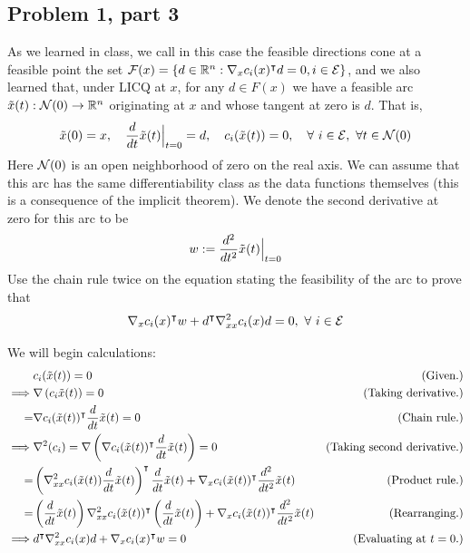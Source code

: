 \newpage
\subsection{Problem 1, part 3}
As we learned in class, we call in this case the feasible directions cone at a feasible point the set $\mathcal{F}(x) = \{ d \in \mathbb{R}^n : \nabla_x c_i(x)^{\intercal} d = 0, i \in \mathcal{E}\}$, and we also learned that, under LICQ at $x$, for any $d \in F(x)$ we have a feasible arc $\Tilde{x}(t): \mathcal{N}(0) \rightarrow \mathbb{R}^n$ originating at $x$ and whose tangent at zero is $d$. That is, 
\[\Tilde{x}(0) = x, \quad \frac{d}{dt}\Tilde{x}(t) \Big|_{t = 0} = d, \quad c_i(\Tilde{x}(t)) = 0,  \quad \forall \ i \in \mathcal{E}, \ \forall t \in \mathcal{N}(0)\]
Here $\mathcal{N}(0)$ is an open neighborhood of zero on the real axis. We can assume that this arc has the same differentiability class as the data functions themselves (this is a consequence of the implicit theorem). We denote the second derivative at zero for this arc to be 
\[w := \frac{d^2}{dt^2}\Tilde{x}(t)\Big|_{t = 0}\]
Use the chain rule twice on the equation stating the feasibility of the arc to prove that
\[\nabla_x c_i(x)^{\intercal} w + d^{\intercal} \nabla_{xx}^2c_i(x) d = 0, \ \forall \ i \in \mathcal{E}\]
\partbreak
\begin{solution}
    
    We will begin calculations:
    \tightalignbreak
    \begin{align*}
        &c_i(\Tilde{x}(t)) = 0 &\text{(Given.)}\\
        \implies &\nabla\left( c_i\Tilde{x}(t)\right) = 0 &\text{(Taking derivative.)}\\
        =& \nabla c_i(\Tilde{x}(t))^{\intercal} \frac{d}{dt}\Tilde{x}(t) = 0 &\text{(Chain rule.)}\\
        \implies & \nabla^2(c_i) = \nabla\left(\nabla c_i(\Tilde{x}(t))^{\intercal} \frac{d}{dt}\Tilde{x}(t) \right) = 0 &\text{(Taking second derivative.)}\\
        =& \left(\nabla^2_{xx} c_i(\Tilde{x}(t)) \frac{d}{dt}\Tilde{x}(t)\right)^{\intercal} \frac{d}{dt}\Tilde{x}(t) + \nabla_x c_i(\Tilde{x}(t))^{\intercal} \frac{d^2}{dt^2}\Tilde{x}(t) &\text{(Product rule.)}\\
        =&\left(\frac{d}{dt}\Tilde{x}(t)\right)\nabla^2_{xx} c_i(\Tilde{x}(t))^{\intercal}  \left(\frac{d}{dt}\Tilde{x}(t)\right) + \nabla_x c_i(\Tilde{x}(t))^{\intercal} \frac{d^2}{dt^2}\Tilde{x}(t) &\text{(Rearranging.)}\\
        \implies & d^{\intercal} \nabla_{xx}^2c_i(x)d + \nabla_x c_i(x)^{\intercal} w = 0 &\text{(Evaluating at $t = 0$.)}
    \end{align*}\vspace{-12mm}\alignbreak
\end{solution}
\newpage
